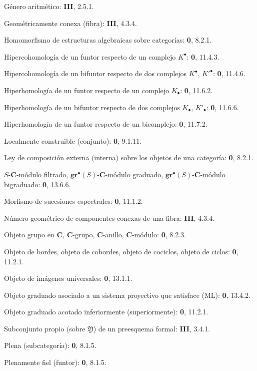 \documentclass[10pt,oneside,openany]{book}
\theoremstyle{egaenv}\newtheorem*{env}{---}
\theoremstyle{egastatement}
\theoremstyle{egadescription}
\newcommand{\oldpage}[2][]{\marginnote{\normalfont\scriptsize\textbf{#1}\,|\,#2}\ignorespaces}
\begin{document}
\begin{flushleft}
Género aritmético: \textbf{III}, 2.5.1.

Geométricamente conexa (fibra): \textbf{III}, 4.3.4.

Homomorfismo de estructuras algebraicas sobre categorías: \textbf 0, 8.2.1.

Hipercohomología de un funtor respecto de un complejo $K^\bullet$:
\textbf 0, 11.4.3.

Hipercohomología de un bifuntor respecto de dos complejos
$K^\bullet$, $K'^{\bullet}$: \textbf 0, 11.4.6.

Hiperhomología de un funtor respecto de un complejo $K_\bullet$:
\textbf 0, 11.6.2.

Hiperhomología de un bifuntor respecto de dos complejos $K_\bullet$,
$K'_\bullet$: \textbf 0, 11.6.6.

Hiperhomología de un funtor respecto de un bicomplejo: \textbf 0, 11.7.2.

Localmente construible (conjunto): \textbf 0, 9.1.11.

Ley de composición externa (interna) sobre los objetos de una categoría: \textbf 0, 8.2.1.

\oldpage[III]{164}

$S$-$\boldsymbol{C}$-módulo filtrado, $\mathbf{gr}^\bullet(S)$-$\boldsymbol{C}$-módulo graduado,
$\mathbf{gr}^\bullet(S)$-$\boldsymbol{C}$-módulo bigraduado: \textbf 0, 13.6.6.

Morfismo de sucesiones espectrales: \textbf 0, 11.1.2.

Número geométrico de componentes conexas de una fibra: \textbf{III}, 4.3.4.

Objeto grupo en $\boldsymbol{C}$, $\boldsymbol{C}$-grupo, $\boldsymbol{C}$-anillo, $\boldsymbol{C}$-módulo: \textbf 0, 8.2.3.

Objeto de bordes, objeto de cobordes, objeto de cociclos, objeto de
ciclos: \textbf 0, 11.2.1.

Objeto de imágenes universales: \textbf 0, 13.1.1.

Objeto graduado asociado a un sistema proyectivo que satisface (ML): \textbf 0, 13.4.2.

Objeto graduado acotado inferiormente (superiormente): \textbf 0, 11.2.1.

Subconjunto propio (sobre $\mathfrak Y$) de un preesquema formal: \textbf{III}, 3.4.1.

Plena (subcategoría): \textbf 0, 8.1.5.

Plenamente fiel (funtor): \textbf 0, 8.1.5.


\end{flushleft}
\end{document}
